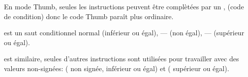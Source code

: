 


En mode Thumb, seules les instructions  peuvent être complètées par un
, (code de condition) donc le code Thumb paraît plus ordinaire.

 est un saut conditionnel normal  (inférieur ou égal),
--- (non égal),
--- (supérieur ou égal).

 est similaire, seules d'autres instructions sont utilisées
pour travailler avec des valeurs non-signées: 
( non signée, inférieur ou égal) et  ( supérieur ou égal).
